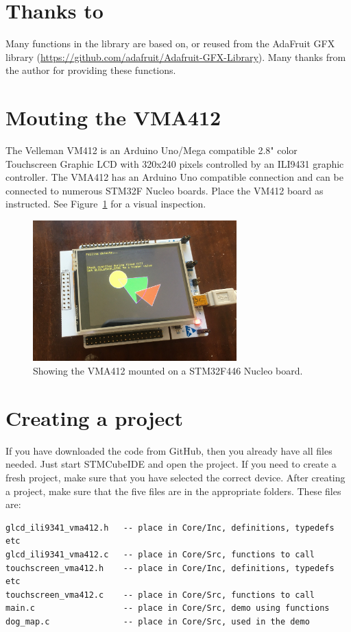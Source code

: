 \documentclass[12pt]{article}
\begin{document}
\section{Thanks to}
Many functions in the library are based on, or reused from the AdaFruit GFX library (\url{https://github.com/adafruit/Adafruit-GFX-Library}). Many thanks from the author for providing these functions.


\section{Mouting the VMA412}
The Velleman VM412 is an Arduino Uno/Mega compatible 2.8" color Touchscreen Graphic LCD with 320x240 pixels controlled by an ILI9431 graphic controller.
The VMA412 has an Arduino Uno compatible connection and can be connected to numerous STM32F Nucleo boards.
Place the VM412 board as instructed. See Figure~\ref{fig:1} for a visual inspection.

\begin{figure}[!ht]
\centering
\includegraphics[width=0.7\textwidth]{glcd_demo}
\caption{Showing the VMA412 mounted on a STM32F446 Nucleo board.}
\label{fig:1}
\end{figure}


\section{Creating a project}
If you have downloaded the code from GitHub, then you already have all files needed. Just start STMCubeIDE and open the project. If you need to create a fresh project, make sure that you have selected the correct device. 
After creating a project, make sure that the five files are in the appropriate folders. These files are:

\begin{lstlisting}
glcd_ili9341_vma412.h   -- place in Core/Inc, definitions, typedefs etc
glcd_ili9341_vma412.c   -- place in Core/Src, functions to call
touchscreen_vma412.h    -- place in Core/Inc, definitions, typedefs etc
touchscreen_vma412.c    -- place in Core/Src, functions to call
main.c                  -- place in Core/Src, demo using functions
dog_map.c               -- place in Core/Src, used in the demo
\end{lstlisting}
\end{document}
